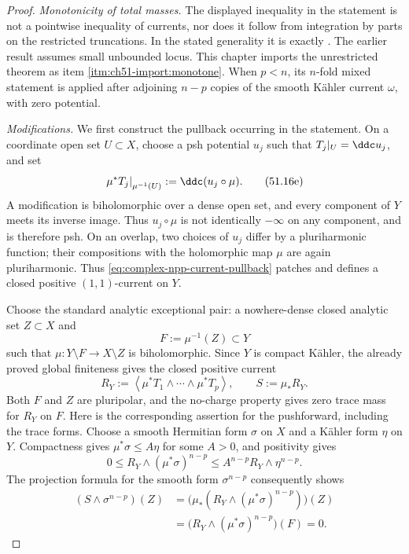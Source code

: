 \begin{proof}
\emph{Monotonicity of total masses.}
The displayed inequality in the statement is not a pointwise inequality of
currents, nor does it follow from integration by parts on the restricted
truncations.  In the stated generality it is exactly
\cite[Theorem~1.1]{DDNL18mono}.  The earlier result
\cite[Theorem~1.16]{BEGZ10} assumes small unbounded locus.  This chapter
imports the unrestricted theorem as
item \cref{itm:ch51-import:monotone}.  When \(p<n\), its \(n\)-fold mixed
statement is applied after adjoining \(n-p\) copies of the smooth K\"ahler
current \(\omega\), with zero potential.

\emph{Modifications.}
We first construct the pullback occurring in the statement.  On a coordinate
open set \(U\subset X\), choose a psh potential \(u_j\) such that
\(T_j|_U=\ddc u_j\), and set
\[
 \left.\mu^*T_j\right|_{\mu^{-1}(U)}
       :=\ddc(u_j\circ\mu).
\tag{51.16e}\label{eq:complex-npp-current-pullback}
\]
A modification is biholomorphic over a dense open set, and every component of
\(Y\) meets its inverse image.  Thus \(u_j\circ\mu\) is not identically
\(-\infty\) on any component, and is therefore psh.  On an overlap, two
choices of \(u_j\) differ by a
pluriharmonic function; their compositions with the holomorphic map
\(\mu\) are again pluriharmonic.  Thus
\eqref{eq:complex-npp-current-pullback} patches and defines a closed positive
\((1,1)\)-current on \(Y\).

Choose the standard analytic exceptional pair: a nowhere-dense closed
analytic set \(Z\subset X\) and
\[
                         F:=\mu^{-1}(Z)\subset Y
\]
such that \(\mu:Y\setminus F\to X\setminus Z\) is biholomorphic.  Since
\(Y\) is compact K\"ahler, the already proved global finiteness gives the
closed positive current
\[
 R_Y:=\left\langle
       \mu^*T_1\wedge\cdots\wedge\mu^*T_p\right\rangle,
 \qquad S:=\mu_*R_Y .
\]
Both \(F\) and \(Z\) are pluripolar, and the no-charge property gives zero
trace mass for \(R_Y\) on \(F\).  Here is the corresponding assertion for
the pushforward, including the trace forms.  Choose a smooth Hermitian form
\(\sigma\) on \(X\) and a K\"ahler form \(\eta\) on \(Y\).  Compactness gives
\(\mu^*\sigma\leq A\eta\) for some \(A>0\), and positivity gives
\[
 0\leq R_Y\wedge(\mu^*\sigma)^{n-p}
 \leq A^{n-p}R_Y\wedge\eta^{n-p}.
\]
The projection formula for the smooth form \(\sigma^{n-p}\) consequently
shows
\[
\begin{aligned}
 (S\wedge\sigma^{n-p})(Z)
 &=\bigl(\mu_*(R_Y\wedge(\mu^*\sigma)^{n-p})\bigr)(Z)\\
 &=\bigl(R_Y\wedge(\mu^*\sigma)^{n-p}\bigr)(F)=0.
\end{aligned}
\tag{51.16f}\label{eq:complex-npp-pushforward-zero-trace}
\]


\end{proof}
